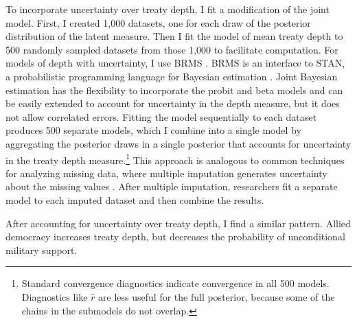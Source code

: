 \documentclass[12pt]{article}
\begin{document}
To incorporate uncertainty over treaty depth, I fit a modification of the joint model. 
First, I created 1,000 datasets, one for each draw of the posterior distribution of the latent measure.
Then I fit the model of mean treaty depth to 500 randomly sampled datasets from those 1,000 to facilitate computation. 
For models of depth with uncertainty, I use BRMS \citep{Buerkner2017}. 
BRMS is an interface to STAN, a probabilistic programming language for Bayesian estimation \citep{Carpenteretal2016}. 
Joint Bayesian estimation has the flexibility to incorporate the probit and beta models and can be easily extended to account for uncertainty in the depth measure, but it does not allow correlated errors. 
Fitting the model sequentially to each dataset produces 500 separate models, which I combine into a single model by aggregating the posterior draws in a single posterior that accounts for uncertainty in the treaty depth measure.\footnote{Standard convergence diagnostics indicate convergence in all 500 models. Diagnostics like $\hat{r}$ are less useful for the full posterior, because some of the chains in the submodels do not overlap.}
This approach is analogous to common techniques for analyzing missing data, where multiple imputation generates uncertainty about the missing values \citep{Hollenbachetal2018imp}.
After multiple imputation, researchers fit a separate model to each imputed dataset and then combine the results. 


After accounting for uncertainty over treaty depth, I find a similar pattern. 
Allied democracy increases treaty depth, but decreases the probability of unconditional military support. 


\singlespace
 
 
\end{document}
